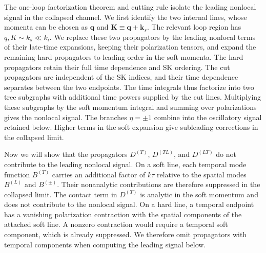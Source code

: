 \documentclass[a4paper,12pt]{article}
\def\mb{\mathbf}
\begin{document}
The one-loop factorization theorem and cutting rule \cite{qin_inflation_2023} isolate the leading nonlocal signal in the collapsed channel.
We first identify the two internal lines, whose momenta can be chosen as $\mb q$ and $\mb K\equiv\mb q+\mb k_s$.
The relevant loop region has $q,K\sim k_s\ll k_i$.
We replace these two propagators by the leading nonlocal terms of their late-time expansions, keeping their polarization tensors, and expand the remaining hard propagators to leading order in the soft momenta.
The hard propagators retain their full time dependence and SK ordering.
The cut propagators are independent of the SK indices, and their time dependence separates between the two endpoints.
The time integrals thus factorize into two tree subgraphs with additional time powers supplied by the cut lines.
Multiplying these subgraphs by the soft momentum integral and summing over polarizations gives the nonlocal signal.
The branches $\eta=\pm1$ combine into the oscillatory signal retained below.
Higher terms in the soft expansion give subleading corrections in the collapsed limit.

Now we will show that the propagators $D^{(T)}$, $D^{(TL)}$, and $D^{(LT)}$ do not contribute to the leading nonlocal signal.
On a soft line, each temporal mode function $B^{(T)}$ carries an additional factor of $k\tau$ relative to the spatial modes $B^{(L)}$ and $B^{(\pm)}$.
Their nonanalytic contributions are therefore suppressed in the collapsed limit.
The contact term in $D^{(T)}$ is analytic in the soft momentum and does not contribute to the nonlocal signal.
On a hard line, a temporal endpoint has a vanishing polarization contraction with the spatial components of the attached soft line.
A nonzero contraction would require a temporal soft component, which is already suppressed.
We therefore omit propagators with temporal components when computing the leading signal below.
\end{document}
